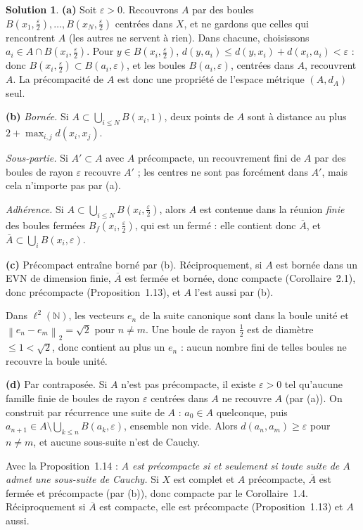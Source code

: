 \documentclass[11pt,a4paper]{article}
\newcommand{\N}{\mathbb{N}}
\newcommand{\adh}[1]{\overline{#1}}
\newcommand{\Bf}{B_f}
\newcommand{\norm}[1]{\left\|#1\right\|}
\theoremstyle{definition}
\newtheorem*{solution}{Solution}
\begin{document}
\begin{solution}
\noindent\textbf{(a)} Soit $\varepsilon>0$. Recouvrons $A$ par des boules $B(x_1,\frac\varepsilon2),\dots,B(x_N,\frac\varepsilon2)$ centrées dans $X$, et ne gardons que celles qui rencontrent $A$ (les autres ne servent à rien). Dans chacune, choisissons $a_i\in A\cap B(x_i,\frac\varepsilon2)$. Pour $y\in B(x_i,\frac\varepsilon2)$, $d(y,a_i)\le d(y,x_i)+d(x_i,a_i)<\varepsilon$ : donc $B(x_i,\frac\varepsilon2)\subset B(a_i,\varepsilon)$, et les boules $B(a_i,\varepsilon)$, centrées dans $A$, recouvrent $A$. La précompacité de $A$ est donc une propriété de l'espace métrique $(A,d_A)$ seul.

\medskip
\noindent\textbf{(b)} \emph{Bornée.} Si $A\subset\bigcup_{i\le N}B(x_i,1)$, deux points de $A$ sont à distance au plus $2+\max_{i,j}d(x_i,x_j)$.

\emph{Sous-partie.} Si $A'\subset A$ avec $A$ précompacte, un recouvrement fini de $A$ par des boules de rayon $\varepsilon$ recouvre $A'$ ; les centres ne sont pas forcément dans $A'$, mais cela n'importe pas par (a).

\emph{Adhérence.} Si $A\subset\bigcup_{i\le N}B(x_i,\frac\varepsilon2)$, alors $A$ est contenue dans la réunion \emph{finie} des boules fermées $\Bf(x_i,\frac\varepsilon2)$, qui est un fermé : elle contient donc $\adh A$, et $\adh A\subset\bigcup_iB(x_i,\varepsilon)$.

\medskip
\noindent\textbf{(c)} Précompact entraîne borné par (b). Réciproquement, si $A$ est bornée dans un EVN de dimension finie, $\adh A$ est fermée et bornée, donc compacte (Corollaire~2.1), donc précompacte (Proposition~1.13), et $A$ l'est aussi par (b).

Dans $\ell^2(\N)$, les vecteurs $e_n$ de la suite canonique sont dans la boule unité et $\norm{e_n-e_m}_2=\sqrt2$ pour $n\ne m$. Une boule de rayon $\frac12$ est de diamètre $\le1<\sqrt2$, donc contient au plus un $e_n$ : aucun nombre fini de telles boules ne recouvre la boule unité.

\medskip
\noindent\textbf{(d)} Par contraposée. Si $A$ n'est pas précompacte, il existe $\varepsilon>0$ tel qu'aucune famille finie de boules de rayon $\varepsilon$ centrées dans $A$ ne recouvre $A$ (par (a)). On construit par récurrence une suite de $A$ : $a_0\in A$ quelconque, puis $a_{n+1}\in A\setminus\bigcup_{k\le n}B(a_k,\varepsilon)$, ensemble non vide. Alors $d(a_n,a_m)\ge\varepsilon$ pour $n\ne m$, et aucune sous-suite n'est de Cauchy.

Avec la Proposition~1.14 : \emph{$A$ est précompacte si et seulement si toute suite de $A$ admet une sous-suite de Cauchy.} Si $X$ est complet et $A$ précompacte, $\adh A$ est fermée et précompacte (par (b)), donc compacte par le Corollaire~1.4. Réciproquement si $\adh A$ est compacte, elle est précompacte (Proposition~1.13) et $A$ aussi.
\end{solution}
\end{document}
